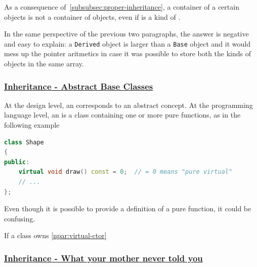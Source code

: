 As a consequence of~\ref{subsubsec:proper-inheritance}, a container 
of a certain  objects is not a container of 
 objects, even if  is a 
kind of .

In the same perspective of the previous two paragraphs, the answer is negative 
and easy to explain: a \texttt{Derived} object is larger than a 
\texttt{Base} object and it would mess up the pointer aritmetics in case 
it was possible to store both the kinds of objects in the same array. 


\subsubsection{\href{https://isocpp.org/wiki/faq/abcs}{\textbf{Inheritance - Abstract Base Classes}}}
At the design level, an  corresponds to an abstract 
concept. At the programming language level, an  is a 
class containing one or more pure  functions, as 
in the following example
\begin{lstlisting}[language=C++]
class Shape
{
public:
    virtual void draw() const = 0;  // = 0 means "pure virtual"
    // ...
};
\end{lstlisting}
Even though it is possible to provide a definition of a pure 
 function, it could be confusing.

If a class owns \ref{npar:virtual-ctor}


\subsubsection{\href{https://isocpp.org/wiki/faq/strange-inheritance}{\textbf{Inheritance - What your mother never told you}}}




